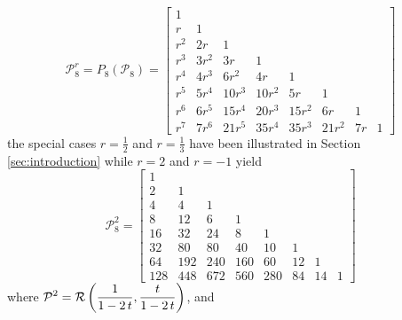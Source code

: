 \begin{example}
\begin{displaymath}
\mathcal{P}_{8}^{r} = P_{8}\left( \mathcal{P}_{8}\right) = \left[\begin{matrix}1 &   &   &   &   &   &   &  \\r & 1 &   &   &   &   &   &  \\r^{2} & 2 r & 1 &   &   &   &   &  \\r^{3} & 3 r^{2} & 3 r & 1 &   &   &   &  \\r^{4} & 4 r^{3} & 6 r^{2} & 4 r & 1 &   &   &  \\r^{5} & 5 r^{4} & 10 r^{3} & 10 r^{2} & 5 r & 1 &   &  \\r^{6} & 6 r^{5} & 15 r^{4} & 20 r^{3} & 15 r^{2} & 6 r & 1 &  \\r^{7} & 7 r^{6} & 21 r^{5} & 35 r^{4} & 35 r^{3} & 21 r^{2} & 7 r & 1\end{matrix}\right]
\end{displaymath}
the special cases $r=\frac{1}{2}$ and $r=\frac{1}{3}$ have been illustrated
in Section \ref{sec:introduction} while $r=2$ and $r=-1$ yield
\begin{displaymath}
\mathcal{P}_{8}^{2} = \left[\begin{matrix}1 &  &  &  &  &  &  & \\2 & 1 &  &  &  &  &  & \\4 & 4 & 1 &  &  &  &  & \\8 & 12 & 6 & 1 &  &  &  & \\16 & 32 & 24 & 8 & 1 &  &  & \\32 & 80 & 80 & 40 & 10 & 1 &  & \\64 & 192 & 240 & 160 & 60 & 12 & 1 & \\128 & 448 & 672 & 560 & 280 & 84 & 14 & 1\end{matrix}\right]
\end{displaymath}
where $\displaystyle\mathcal{P}^{2} = \mbox{$\mathcal{R}$}\left(\frac{1}{1-2\,t},\frac{t}{1-2\,t} \right)$, and
\begin{displaymath}

\end{displaymath}
\end{example}
